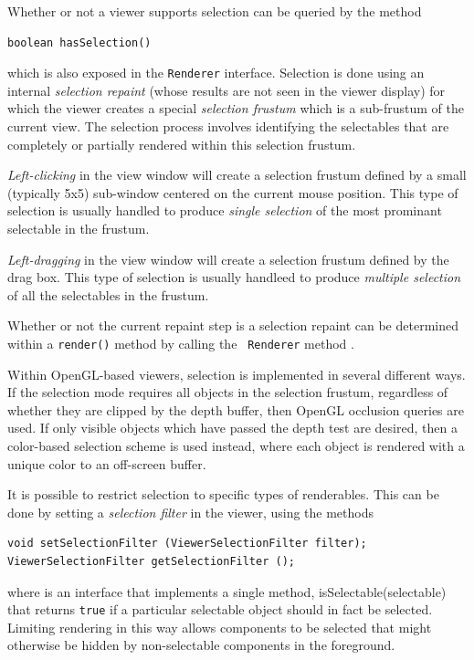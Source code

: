 Whether or not a viewer supports selection can be queried
by the method
%
\begin{lstlisting}[]
boolean hasSelection()
\end{lstlisting}
%
which is also exposed in the {\tt Renderer} interface.  Selection is done
using an internal {\it selection repaint} (whose results are not
seen in the viewer display) for which the viewer creates a special
{\it selection frustum} which is a sub-frustum of the current
view. The selection process involves identifying the selectables that
are completely or partially rendered within this selection frustum.



{\it Left-clicking} in the view window will create a selection frustum
defined by a small (typically 5x5) sub-window centered on the current
mouse position. This type of selection is usually handled to produce
{\it single selection} of the most prominant selectable in the
frustum.

{\it Left-dragging} in the view window will create a selection frustum
defined by the drag box.  This type of selection is usually handleed
to produce {\it multiple selection} of all the selectables in the
frustum.

Whether or not the current repaint step is a selection repaint can be
determined within a {\tt render()} method by calling the {\tt
Renderer} method .


Within OpenGL-based viewers, selection is implemented in several
different ways.  If the selection mode requires all objects in the
selection frustum, regardless of whether they are clipped by the depth
buffer, then OpenGL occlusion queries are used. If only visible
objects which have passed the depth test are desired, then a
color-based selection scheme is used instead, where each object is
rendered with a unique color to an off-screen buffer.

It is possible to restrict selection to specific types of renderables.
This can be done by setting a {\it selection filter} in the viewer,
using the methods
%
\begin{lstlisting}[]
void setSelectionFilter (ViewerSelectionFilter filter);
ViewerSelectionFilter getSelectionFilter ();
\end{lstlisting}
%
where  is an
interface that implements a single method,
%
{isSelectable(selectable)} that returns {\tt true} if a particular
selectable object should in fact be selected.
Limiting rendering in this way allows components to be
selected that might otherwise be hidden by non-selectable components
in the foreground.


